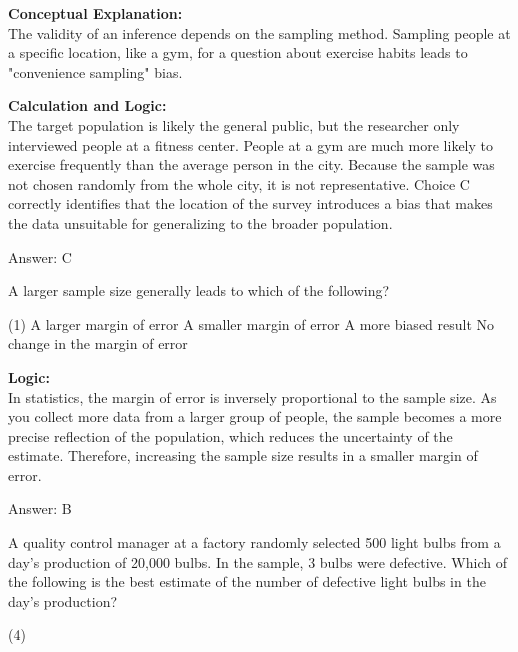 \documentclass[11pt,paper=a4,answers]{exam}
\begin{document}
\begin{questions}
\begin{solution}
\textbf{Conceptual Explanation:} \\
The validity of an inference depends on the sampling method. Sampling people at a specific location, like a gym, for a question about exercise habits leads to "convenience sampling" bias.

\vspace{30pt}

\textbf{Calculation and Logic:} \\
The target population is likely the general public, but the researcher only interviewed people at a fitness center. People at a gym are much more likely to exercise frequently than the average person in the city. Because the sample was not chosen randomly from the whole city, it is not representative. Choice C correctly identifies that the location of the survey introduces a bias that makes the data unsuitable for generalizing to the broader population.

\vspace{30pt}

Answer: \colorbox{yellow!100}{C}
\end{solution}

\vspace{60pt}

\question
A larger sample size generally leads to which of the following?
\begin{tasks}(1)
    \task A larger margin of error
    \task A smaller margin of error
    \task A more biased result
    \task No change in the margin of error
\end{tasks}

\begin{solution}
\textbf{Logic:} \\
In statistics, the margin of error is inversely proportional to the sample size. As you collect more data from a larger group of people, the sample becomes a more precise reflection of the population, which reduces the uncertainty of the estimate. Therefore, increasing the sample size results in a smaller margin of error.

\vspace{30pt}

Answer: \colorbox{yellow!100}{B}
\end{solution}

\vspace{60pt}

\question
A quality control manager at a factory randomly selected 500 light bulbs from a day's production of 20,000 bulbs. In the sample, 3 bulbs were defective. Which of the following is the best estimate of the number of defective light bulbs in the day's production?
\begin{tasks}(4)
\end{tasks}


\end{questions}
\end{document}
